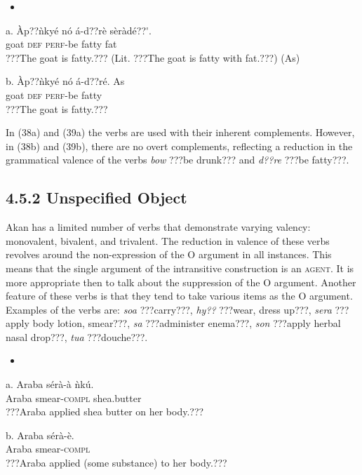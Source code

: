 \documentclass[output=paper]{langsci/langscibook}
\begin{document}
\begin{itemize}
\item \end{itemize}
\gll a.  \`{A}p??\`{n}ky\'{e}  n\'{o}  \'{a}-d??r\`{e}      s\`{e}r\`{a}d\'{e}??\'{ }.\\
       goat    \textsc{def}  \textsc{perf}{}-be fatty    fat\\
\glt   ???The goat is fatty.??? (Lit. ???The goat is fatty with fat.???) (As)
\z

\gll  b.  \`{A}p??\`{n}ky\'{e}  n\'{o}  \'{a}-d??r\'{e}.      As\\
       goat    \textsc{def}  \textsc{perf}{}-be fatty  \\
\glt   ???The goat is fatty.???
\z

In (38a) and (39a) the verbs are used with their inherent complements. However, in (38b) and (39b), there are no overt complements, reflecting a reduction in the grammatical valence of the verbs \emph{bow} ???be drunk??? and \emph{d??re} ???be fatty???.

\subsection{4.5.2  Unspecified Object}

Akan has a limited number of verbs that demonstrate varying valency: monovalent, bivalent, and trivalent. The reduction in valence of these verbs revolves around the non-expression of the O argument in all instances. This means that the single argument of the intransitive construction is an \textsc{agent}. It is more appropriate then to talk about the suppression of the O argument. Another feature of these verbs is that they tend to take various items as the O argument. Examples of the verbs are: \emph{soa} ???carry???, \emph{hy??} ???wear, dress up???, \emph{sera} ???apply body lotion, smear???, \emph{sa} ???administer enema???, \emph{son} ???apply herbal nasal drop???, \emph{tua} ???douche???.

\begin{itemize}
\item \end{itemize}
\gll a.  Araba  s\'{e}r\`{a}-\`{a}    \`{n}k\'{u}.\\
       Araba  smear-\textsc{compl}  shea.butter\\
\glt ???Araba applied shea butter on her body.???
\z

\gll  b.  Araba  s\'{e}r\`{a}-\`{e}.\\
       Araba  smear-\textsc{compl}\\
\glt ???Araba applied (some substance) to her body.???
\z
\end{document}
